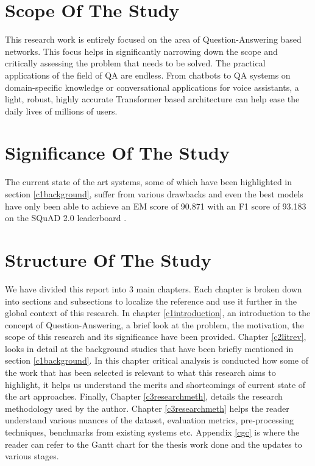 \documentclass[a4paper,12pt]{report}
\begin{document}
        \section{Scope Of The Study}\label{13}

        This research work is entirely focused on the area of Question-Answering based networks. This focus helps in significantly narrowing down the scope and critically assessing the problem that needs to be solved. The practical applications of the field of QA are endless. From chatbots to QA systems on domain-specific knowledge or conversational applications for voice assistants, a light, robust, highly accurate Transformer based architecture can help ease the daily lives of millions of users.
        \section{Significance Of The Study}\label{14}

        The current state of the art systems, some of which have been highlighted in section \ref{c1background}, suffer from various drawbacks and even the best models have only been able to achieve an EM score of 90.871 with an F1 score of 93.183 on the SQuAD 2.0 leaderboard \citep{squad}.
        \section{Structure Of The Study}\label{15}
           We have divided this report into 3 main chapters. Each chapter is broken down into sections and subsections to localize the reference and use it further in the global context of this research. In chapter \ref{c1introduction}, an introduction to the concept of Question-Answering, a brief look at the problem, the motivation, the scope of this research and its significance have been provided. Chapter \ref{c2litrev}, looks in detail at the background studies that have been briefly mentioned in section \ref{c1background}. In this chapter critical analysis is conducted how some of the work that has been selected is relevant to what this research aims to highlight, it helps us understand the merits and shortcomings of current state of the art approaches. Finally, Chapter \ref{c3researchmeth}, details the research methodology used by the author. Chapter \ref{c3researchmeth} helps the reader understand various nuances of the dataset, evaluation metrics, pre-processing techniques, benchmarks from existing systems etc.
           Appendix \ref{cgc} is where the reader can refer to the Gantt chart for the thesis work done and the updates to various stages.
\end{document}
